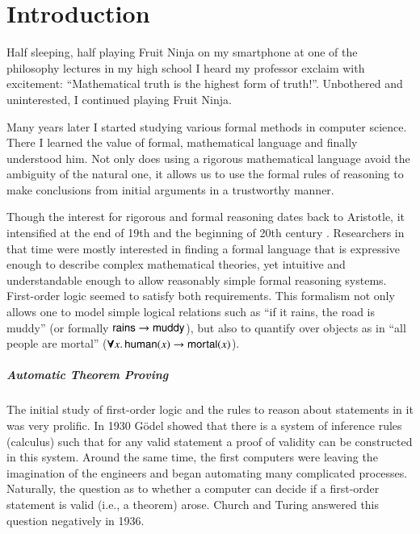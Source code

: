 \chapter{Introduction}
\label{ch:intro}

Half sleeping, half playing Fruit Ninja on my smartphone at one of the
philosophy lectures in my high school I heard my professor exclaim with
excitement: “Mathematical truth is the highest form of truth!”.
Unbothered and uninterested, I continued playing Fruit Ninja.

Many years later I started studying various formal methods in computer science.
There I learned the value of formal, mathematical language and finally
understood him. Not only does using a rigorous mathematical language avoid the
ambiguity of the natural one, it allows us to use the formal rules of reasoning
to make conclusions from initial arguments in a trustworthy manner. 

Though the interest for rigorous and formal reasoning dates back to Aristotle,
it intensified at the end of 19th and the beginning of 20th century
\cite{jf-01-modern-logic}. Researchers in that time were mostly interested in
finding a formal language that is expressive enough to describe complex
mathematical theories, yet intuitive and understandable enough to allow
reasonably simple formal reasoning systems. First-order logic seemed to satisfy
both requirements.  This formalism not only allows one to model simple
logical relations such as ``if it rains, the road is muddy'' (or formally
$\mathsf{rains} \rightarrow \mathsf{muddy}$), but also to quantify over objects as in ``all
people are mortal'' ($\pmb{\forall} x.\, \mathsf{human}(x) \rightarrow \mathsf{mortal}(x)$).

\paragraph{Automatic Theorem Proving}The initial study of first-order logic and the rules to reason about statements in
it was very prolific. In 1930 G\"odel \cite{kg-30-completeness-theorem} showed
that there is a system of inference rules (calculus) such that for any valid
statement a proof of validity can be constructed in this system. Around the same
time, the first computers were leaving the imagination of the engineers and
began automating many complicated processes.  Naturally, the question as to
whether a computer can decide if a first-order statement is valid (i.e., a
theorem) arose. Church \cite{ac-36-fol-undecidable} and Turing
\cite{tm-37-undecidable} answered this question negatively in 1936.

